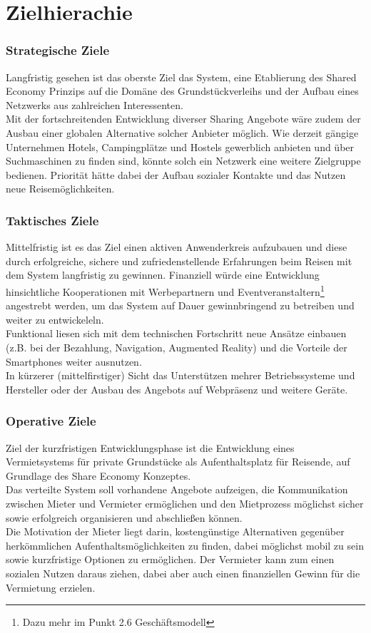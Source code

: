 
\section{Zielhierachie}

\subsubsection{Strategische Ziele}
Langfristig gesehen ist das oberste Ziel das System, eine Etablierung des Shared Economy Prinzips auf die Domäne des Grundstückverleihs und der Aufbau eines Netzwerks aus zahlreichen Interessenten.\\
Mit der fortschreitenden Entwicklung diverser Sharing Angebote wäre zudem der Ausbau einer globalen Alternative solcher Anbieter möglich. Wie derzeit gängige Unternehmen Hotels, Campingplätze und Hostels gewerblich anbieten und über Suchmaschinen zu finden sind, könnte solch ein Netzwerk eine weitere Zielgruppe bedienen. Priorität hätte dabei der Aufbau sozialer Kontakte und das Nutzen neue Reisemöglichkeiten.


\subsubsection{Taktisches Ziele}
Mittelfristig ist es das Ziel einen aktiven Anwenderkreis aufzubauen und diese durch erfolgreiche, sichere und zufriedenstellende Erfahrungen beim Reisen mit dem System langfristig zu gewinnen.
Finanziell würde eine Entwicklung hinsichtliche Kooperationen mit Werbepartnern und Eventveranstaltern\footnote{Dazu mehr im Punkt 2.6 Geschäftsmodell} angestrebt werden, um das System auf Dauer gewinnbringend zu betreiben und weiter zu entwickeleln. \\
Funktional liesen sich mit dem technischen Fortschritt neue Ansätze einbauen (z.B. bei der Bezahlung, Navigation, Augmented Reality) und die Vorteile der Smartphones weiter ausnutzen. \\
In kürzerer (mittelfirstiger) Sicht das Unterstützen mehrer Betriebssysteme und Hersteller oder der Ausbau des Angebots auf Webpräsenz und weitere Geräte.


\subsubsection{Operative Ziele}
Ziel der kurzfristigen Entwicklungsphase ist die Entwicklung eines Vermietsystems für private Grundstücke als Aufenthaltsplatz für Reisende, auf Grundlage des Share Economy Konzeptes.\\
Das verteilte System soll vorhandene Angebote aufzeigen, die Kommunikation zwischen Mieter und Vermieter ermöglichen und den Mietprozess möglichst sicher sowie erfolgreich organisieren und abschließen können.\\
Die Motivation der Mieter liegt darin, kostengünstige Alternativen gegenüber herkömmlichen Aufenthaltsmöglichkeiten zu finden, dabei möglichst mobil zu sein sowie kurzfristige Optionen zu ermöglichen. Der Vermieter kann zum einen sozialen Nutzen daraus ziehen, dabei aber auch einen finanziellen Gewinn für die Vermietung erzielen. 


